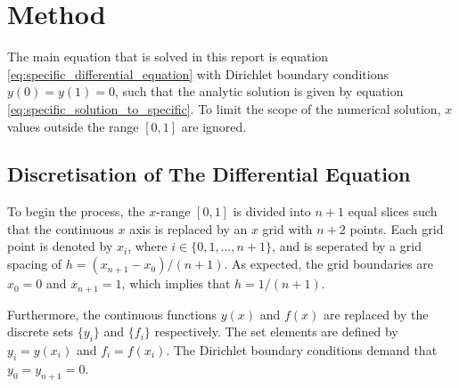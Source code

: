 \documentclass[reprint,english]{revtex4-1}
\begin{document}
\section{Method}
The main equation that is solved in this report is equation \eqref{eq:specific_differential_equation} with Dirichlet boundary conditions \(y(0)=y(1)=0\), such that the analytic solution is given by equation \eqref{eq:specific_solution_to_specific}. To limit the scope of the numerical solution, \(x\) values outside the range \([0,1]\) are ignored.
\subsection{Discretisation of The Differential Equation}\label{sec:discretise_diffeq}
To begin the process, the \(x\)-range \([0,1]\) is divided into \(n+1\) equal slices such that the continuous \(x\) axis is replaced by an \(x\) grid with \(n+2\) points. Each grid point is denoted by \(x_i\), where \(i\in\{0,1,\ldots,n+1\}\), and is seperated by a grid spacing of \(h=(x_{n+1}-x_0)/(n+1)\). As expected, the grid boundaries are \(x_0=0\) and \(x_{n+1}=1\), which implies that \(h=1/(n+1)\).

Furthermore, the continuous functions \(y(x)\) and \(f(x)\) are replaced by the discrete sets \(\{y_i\}\) and \(\{f_i\}\) respectively. The set elements are defined by \(y_i=y(x_i)\) and \(f_i=f(x_i)\). The Dirichlet boundary conditions demand that \(y_0=y_{n+1}=0\).
\end{document}
